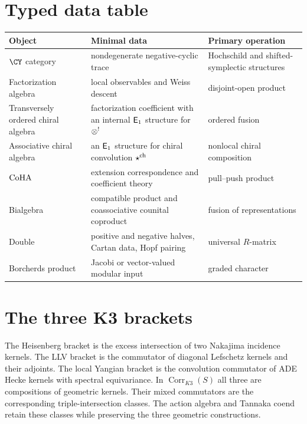 \chapter{Typed data table}
\begin{center}
\small
\begin{tabularx}{0.98\textwidth}{@{}>{\raggedright\arraybackslash}p{}>{\raggedright\arraybackslash}X>{\raggedright\arraybackslash}p{}@{}}
\toprule
\textbf{Object}&\textbf{Minimal data}&\textbf{Primary operation}\\
\midrule
$\CY$ category&nondegenerate negative-cyclic trace&Hochschild and shifted-symplectic structures\\
Factorization algebra&local observables and Weiss descent&disjoint-open product\\
Transversely ordered chiral algebra&factorization coefficient with an internal $\mathsf E_1$ structure for $\otimes^!$&ordered fusion\\
Associative chiral algebra&an $\mathsf E_1$ structure for chiral convolution $\mathbin{\star^{\mathrm{ch}}}$&nonlocal chiral composition\\
$\operatorname{CoHA}$&extension correspondence and coefficient theory&pull--push product\\
Bialgebra&compatible product and coassociative counital coproduct&fusion of representations\\
Double&positive and negative halves, Cartan data, Hopf pairing&universal $R$-matrix\\
Borcherds product&Jacobi or vector-valued modular input&graded character\\
\bottomrule
\end{tabularx}
\end{center}

\chapter{The three K3 brackets}
The Heisenberg bracket is the excess intersection of two Nakajima incidence kernels.  The LLV bracket is the commutator of diagonal Lefschetz kernels and their adjoints.  The local Yangian bracket is the convolution commutator of ADE Hecke kernels with spectral equivariance.  In $\operatorname{Corr}_{K3}(S)$ all three are compositions of geometric kernels.  Their mixed commutators are the corresponding triple-intersection classes.  The action algebra and Tannaka coend retain these classes while preserving the three geometric constructions.

